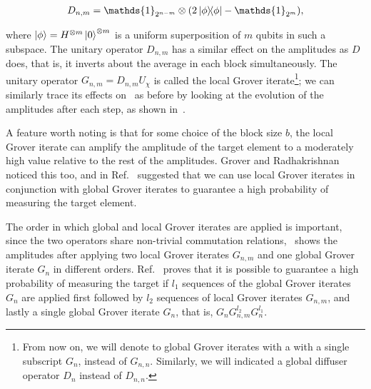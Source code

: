 \begin{align}
	D_{n,m} = \mathds{1}_{2^{n-m}} \otimes (2\op{\phi} - \mathds{1}_{2^m}),
\end{align}

\noindent
where $\ket{\phi} = H^{\otimes m} \ket{0}^{\otimes m}$ is a uniform superposition of $m$ qubits in such a subspace. The unitary operator $D_{n,m}$ has a similar effect on the amplitudes as $D$ does, that is, it inverts about the average in each block simultaneously. The unitary operator $G_{n,m} = D_{n,m}U_{\chi}$ is called the local Grover iterate\footnote{From now on, we will denote to global Grover iterates with a with a single subscript $G_{n}$, instead of $G_{n,n}$. Similarly, we will indicated a global diffuser operator $D_{n}$ instead of $D_{n,n}$.}; we can similarly trace its effects on~ as before by looking at the evolution of the amplitudes after each step, as shown in~.

\bigskip
\noindent
A feature worth noting is that for some choice of the block size $b$, the local Grover iterate can amplify the amplitude of the target element to a moderately high value relative to the rest of the amplitudes. Grover and Radhakrishnan noticed this too, and in Ref.~\cite{Grover_2005} suggested that we can use local Grover iterates in conjunction with global Grover iterates to guarantee a high probability of measuring the target element. 

\bigskip
\noindent
The order in which global and local Grover iterates are applied is important, since the two operators share non-trivial commutation relations,~ shows the amplitudes after applying two local Grover iterates $G_{n,m}$ and one global Grover iterate $G_{n}$ in different orders. Ref.~\cite{Grover_2005} proves that it is possible to guarantee a high probability of measuring the target if $l_1$ sequences of the global Grover iterates $G_n$ are applied first followed by $l_2$ sequences of local Grover iterates $G_{n,m}$, and lastly a single global Grover iterate $G_n$, that is, $G_n G_{n,m}^{l_2}G_{n}^{l_1}$.

\clearpage


